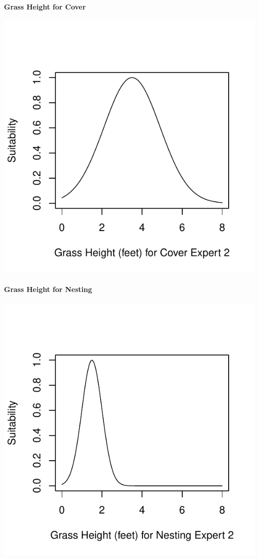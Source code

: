 \documentclass[12pt,letterpaper]{article}\usepackage{graphicx, color}
\makeatletter
\def\maxwidth{ %
  \ifdim\Gin@nat@width>\linewidth
    \linewidth
  \else
    \Gin@nat@width
  \fi
}
\newenvironment{knitrout}{}{} %
\makeatother
\begin{document}
\paragraph{Grass Height for Cover}
\begin{knitrout}
\color{fgcolor}\includegraphics[width=\maxwidth]{figure/SAlly_Grass_Height_cover} 
\end{knitrout}

\paragraph{Grass Height for Nesting}
\begin{knitrout}
\color{fgcolor}\includegraphics[width=\maxwidth]{figure/SAlly_Grass_Height_Nesting} 
\end{knitrout}
\end{document}
